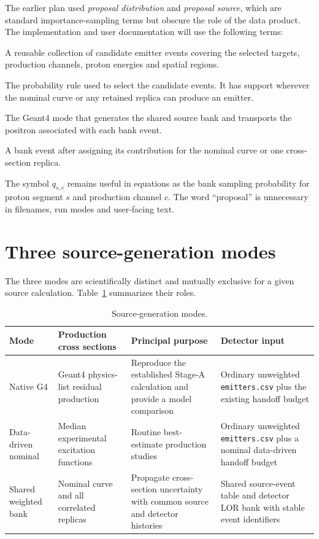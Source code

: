 \documentclass[11pt]{article}
\newcommand{\file}[1]{\texttt{#1}}
\begin{document}
The earlier plan used \emph{proposal distribution} and \emph{proposal source},
which are standard importance-sampling terms but obscure the role of the data
product.  The implementation and user documentation will use the following
terms:

\begin{description}[style=nextline,leftmargin=0pt]
  \item[Shared source bank]
  A reusable collection of candidate emitter events covering the selected
  targets, production channels, proton energies and spatial regions.

  \item[Bank sampling distribution]
  The probability rule used to select the candidate events.  It has support
  wherever the nominal curve or any retained replica can produce an emitter.

  \item[Source-bank mode]
  The Geant4 mode that generates the shared source bank and transports the
  positron associated with each bank event.

  \item[Weighted source event]
  A bank event after assigning its contribution for the nominal curve or one
  cross-section replica.
\end{description}

The symbol $q_{s,c}$ remains useful in equations as the bank sampling
probability for proton segment $s$ and production channel $c$.  The word
``proposal'' is unnecessary in filenames, run modes and user-facing text.

\section{Three source-generation modes}

The three modes are scientifically distinct and mutually exclusive for a
given source calculation.  Table~\ref{tab:modes} summarizes their roles.

\begin{table}[ht]
\centering\small
\caption{Source-generation modes.}
\label{tab:modes}
\begin{tabular}{p{}p{}p{}p{}}
\toprule
Mode & Production cross sections & Principal purpose & Detector input \\
\midrule
Native G4 & Geant4 physics-list residual production & Reproduce the
established Stage-A calculation and provide a model comparison & Ordinary
unweighted \file{emitters.csv} plus the existing handoff budget \\
Data-driven nominal & Median experimental excitation functions & Routine
best-estimate production studies & Ordinary unweighted
\file{emitters.csv} plus a nominal data-driven handoff budget \\
Shared weighted bank & Nominal curve and all correlated replicas & Propagate
cross-section uncertainty with common source and detector histories & Shared
source-event table and detector LOR bank with stable event identifiers \\
\bottomrule
\end{tabular}
\end{table}
\end{document}
